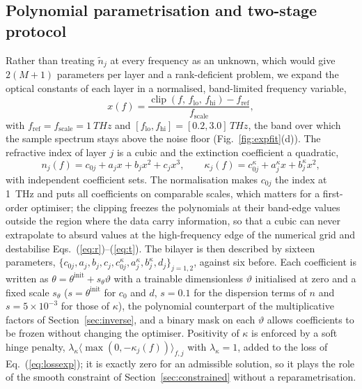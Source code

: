 \documentclass{optica-article}
\newcommand{\kap}{\kappa}
\begin{document}
\subsection{Polynomial parametrisation and two-stage protocol}
Rather than treating $\tilde n_j$ at every frequency as an unknown, which would give $2(M+1)$ parameters per layer and a rank-deficient problem, we expand the optical constants of each layer in a normalised, band-limited frequency variable,
\begin{equation}
  x(f)=\frac{\operatorname{clip}(f,\,f_{\mathrm{lo}},\,f_{\mathrm{hi}})-f_{\mathrm{ref}}}{f_{\mathrm{scale}}},
  \label{eq:xnorm}
\end{equation}
with $f_{\mathrm{ref}}=f_{\mathrm{scale}}=\SI{1}{THz}$ and $[f_{\mathrm{lo}},f_{\mathrm{hi}}]=[0.2,3.0]\,\si{THz}$, the band over which the sample spectrum stays above the noise floor (Fig.~\ref{fig:expfit}(d)). The refractive index of layer $j$ is a cubic and the extinction coefficient a quadratic,
\begin{equation}
  n_j(f)=c_{0j}+a_j x+b_j x^2+c_j x^3,\qquad
  \kap_j(f)=c^{\kap}_{0j}+a^{\kap}_j x+b^{\kap}_j x^2,
  \label{eq:poly}
\end{equation}
with independent coefficient sets. The normalisation makes $c_{0j}$ the index at \SI{1}{THz} and puts all coefficients on comparable scales, which matters for a first-order optimiser; the clipping freezes the polynomials at their band-edge values outside the region where the data carry information, so that a cubic can never extrapolate to absurd values at the high-frequency edge of the numerical grid and destabilise Eqs.~(\ref{eq:r})--(\ref{eq:t}). The bilayer is then described by sixteen parameters, $\{c_{0j},a_j,b_j,c_j,c^\kap_{0j},a^\kap_j,b^\kap_j,d_j\}_{j=1,2}$, against six before. Each coefficient is written as $\theta=\theta^{\mathrm{init}}+s_\theta\vartheta$ with a trainable dimensionless $\vartheta$ initialised at zero and a fixed scale $s_\theta$ ($s=\theta^{\mathrm{init}}$ for $c_0$ and $d$, $s=0.1$ for the dispersion terms of $n$ and $s=5\times10^{-3}$ for those of $\kap$), the polynomial counterpart of the multiplicative factors of Section~\ref{sec:inverse}, and a binary mask on each $\vartheta$ allows coefficients to be frozen without changing the optimiser. Positivity of $\kap$ is enforced by a soft hinge penalty, $\lambda_\kap\langle\max(0,-\kap_j(f))\rangle_{f,j}$ with $\lambda_\kap=1$, added to the loss of Eq.~(\ref{eq:lossexp}); it is exactly zero for an admissible solution, so it plays the role of the smooth constraint of Section~\ref{sec:constrained} without a reparametrisation.
\end{document}
